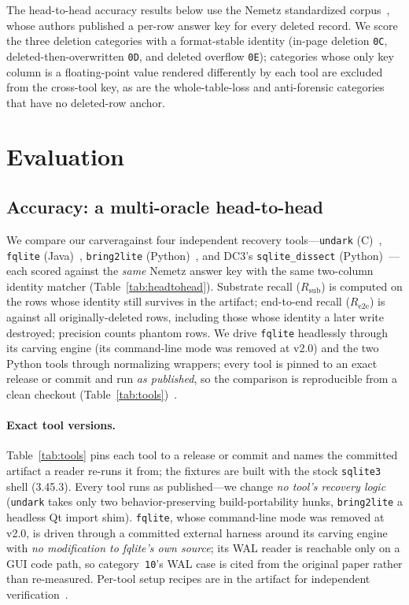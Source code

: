 \documentclass[10pt,a4paper]{article}
\newcommand{\code}[1]{\texttt{#1}}
\newcommand{\sys}{our carver}
\newcommand{\sys}{\texttt{sqlite4n6}}
\begin{document}
The head-to-head accuracy results below use the Nemetz standardized
corpus~\cite{nemetz2018corpus}, whose authors published a per-row answer key for
every deleted record. We score the three deletion categories with a format-stable
identity (in-page deletion \code{0C}, deleted-then-overwritten \code{0D}, and
deleted overflow \code{0E}); categories whose only key column is a floating-point
value rendered differently by each tool are excluded from the cross-tool key, as
are the whole-table-loss and anti-forensic categories that have no deleted-row
anchor.

\section{Evaluation}\label{sec:eval}

\subsection*{Accuracy: a multi-oracle head-to-head}
We compare \sys against four independent recovery tools---\code{undark}
(C)~\cite{undark}, \code{fqlite} (Java)~\cite{pawlaszczyk2021fqlite}, \code{bring2lite}
(Python)~\cite{meng2019bring2lite}, and DC3's \code{sqlite\_dissect}
(Python)~\cite{sqlite_dissect_dc3}---each scored against the \emph{same}
Nemetz answer key with the same two-column identity matcher
(Table~\ref{tab:headtohead}). Substrate recall ($R_{\mathrm{sub}}$) is computed on
the rows whose identity still survives in the artifact; end-to-end recall
($R_{\mathrm{e2e}}$) is against all originally-deleted rows, including those whose
identity a later write destroyed; precision counts phantom rows. We drive \code{fqlite} headlessly through its carving engine (its command-line mode was
removed at v2.0) and the two Python tools through normalizing wrappers; every tool is
pinned to an exact release or commit and run \emph{as published}, so the comparison is
reproducible from a clean checkout (Table~\ref{tab:tools})~\cite{sqlite4n6}.

\paragraph{Exact tool versions.}
Table~\ref{tab:tools} pins each tool to a release or commit and names the committed
artifact a reader re-runs it from; the fixtures are built with the stock \code{sqlite3}
shell (3.45.3). Every tool runs as published---we change \emph{no tool's recovery logic}
(\code{undark} takes only two behavior-preserving build-portability hunks, \code{bring2lite}
a headless Qt import shim). \code{fqlite}, whose command-line mode was removed at v2.0, is
driven through a committed external harness around its carving engine with \emph{no
modification to fqlite's own source}; its WAL reader is reachable only on a GUI code path,
so category~\code{10}'s WAL case is cited from the original paper rather than re-measured.
Per-tool setup recipes are in the artifact for independent verification~\cite{sqlite4n6}.
\end{document}

